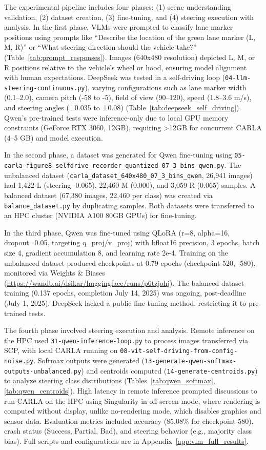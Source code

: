 The experimental pipeline includes four phases: (1) scene understanding validation, (2) dataset creation, (3) fine-tuning, and (4) steering execution with analysis. In the first phase, VLMs were prompted to classify lane marker positions using prompts like ``Describe the location of the green lane marker (L, M, R)'' or ``What steering direction should the vehicle take?'' (Table~\ref{tab:prompt_responses}). Images (640x480 resolution) depicted L, M, or R positions relative to the vehicle’s wheel or hood, ensuring model alignment with human expectations. DeepSeek was tested in a self-driving loop (\texttt{04-llm-steering-continuous.py}), varying configurations such as lane marker width (0.1--2.0), camera pitch (-58 to -5), field of view (90--120), speed (1.8--3.6 m/s), and steering angles (±0.035 to ±0.08) (Table~\ref{tab:deepseek_self_driving}). Qwen’s pre-trained tests were inference-only due to local GPU memory constraints (GeForce RTX 3060, 12GB), requiring >12GB for concurrent CARLA (4--5 GB) and model execution.

In the second phase, a dataset was generated for Qwen fine-tuning using \texttt{05-carla\_figure8\_selfdrive\_recorder\_quantized\_07\_3\_bins\_qwen.py}. The unbalanced dataset (\texttt{carla\_dataset\_640x480\_07\_3\_bins\_qwen}, 26,941 images) had 1,422 L (steering -0.065), 22,460 M (0.000), and 3,059 R (0.065) samples. A balanced dataset (67,380 images, 22,460 per class) was created via \texttt{balance\_dataset.py} by duplicating samples. Both datasets were transferred to an HPC cluster (NVIDIA A100 80GB GPUs) for fine-tuning.

In the third phase, Qwen was fine-tuned using QLoRA (r=8, alpha=16, dropout=0.05, targeting q\_proj/v\_proj) with bfloat16 precision, 3 epochs, batch size 4, gradient accumulation 8, and learning rate 2e-4. Training on the unbalanced dataset produced checkpoints at 0.79 epochs (checkpoint-520, -580), monitored via Weights \& Biases (\url{https://wandb.ai/dsikar/huggingface/runs/p6tzjohj}). The balanced dataset training (0.137 epochs, completion July 14, 2025) was ongoing, post-deadline (July 1, 2025). DeepSeek lacked a public fine-tuning method, restricting it to pre-trained tests.

The fourth phase involved steering execution and analysis. Remote inference on the HPC used \texttt{31-qwen-inference-loop.py} to process images transferred via SCP, with local CARLA running on \texttt{08-vit-self-driving-from-config-noise.py}. Softmax outputs were generated (\texttt{13-generate-qwen-softmax-outputs-unbalanced.py}) and centroids computed (\texttt{14-generate-centroids.py}) to analyze steering class distributions (Tables~\ref{tab:qwen_softmax}, \ref{tab:qwen_centroids}). High latency in remote inference prompted discussions to run CARLA on the HPC using Singularity \cite{kurtzer2017singularity} in off-screen mode, where rendering is computed without display, unlike no-rendering mode, which disables graphics and sensor data. Evaluation metrics included accuracy (85.08\% for checkpoint-580), crash status (Success, Partial, Bad), and steering behavior (e.g., majority class bias). Full scripts and configurations are in Appendix~\ref{app:vlm_full_results}.




